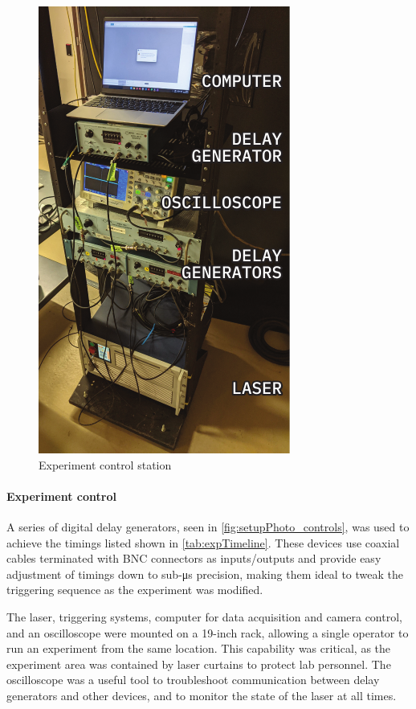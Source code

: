                 \begin{figure}
                    \centering
                    \includegraphics{assets/3 design/setupPhoto_control}
                    \caption{Experiment control station}
                    \label{fig:setupPhoto_controls}
                \end{figure}

                \paragraph{Experiment control} A series of digital delay generators, seen in \autoref{fig:setupPhoto_controls}, was used to achieve the timings listed shown in \autoref{tab:expTimeline}. These devices use coaxial cables terminated with BNC connectors as inputs/outputs and provide easy adjustment of timings down to sub-\unit{\us} precision, making them ideal to tweak the triggering sequence as the experiment was modified.

                The laser, triggering systems, computer for data acquisition and camera control, and an oscilloscope were mounted on a 19-inch rack, allowing a single operator to run an experiment from the same location. This capability was critical, as the experiment area was contained by laser curtains to protect lab personnel. The oscilloscope was a useful tool to troubleshoot communication between delay generators and other devices, and to monitor the state of the laser at all times.

